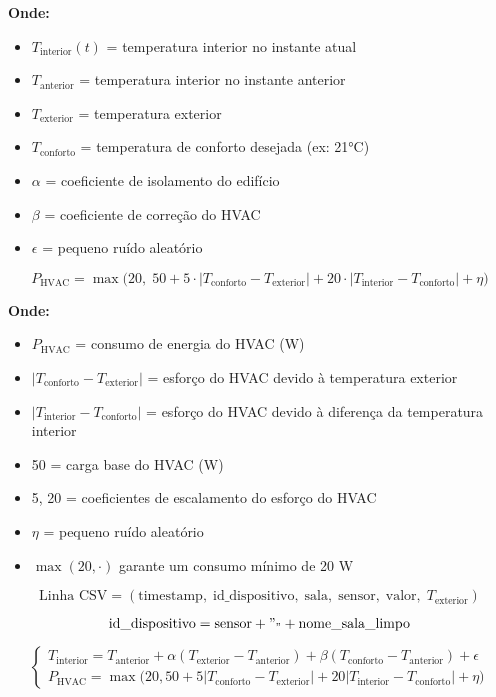 \documentclass[a4paper, 12pt]{article} %
\begin{document}
\textbf{Onde:}
\begin{itemize}
	\item $T_{\text{interior}}(t)$ = temperatura interior no instante atual
	\item $T_{\text{anterior}}$ = temperatura interior no instante anterior
	\item $T_{\text{exterior}}$ = temperatura exterior
	\item $T_{\text{conforto}}$ = temperatura de conforto desejada (ex: 21°C)
	\item $\alpha$ = coeficiente de isolamento do edifício
	\item $\beta$ = coeficiente de correção do HVAC
	\item $\epsilon$ = pequeno ruído aleatório
\end{itemize}

\[
P_{\text{HVAC}} = \max \Bigg(20, \; 50 + 5 \cdot |T_{\text{conforto}} - T_{\text{exterior}}| + 20 \cdot |T_{\text{interior}} - T_{\text{conforto}}| + \eta \Bigg)
\]

\textbf{Onde:}
\begin{itemize}
	\item $P_{\text{HVAC}}$ = consumo de energia do HVAC (W)
	\item $|T_{\text{conforto}} - T_{\text{exterior}}|$ = esforço do HVAC devido à temperatura exterior
	\item $|T_{\text{interior}} - T_{\text{conforto}}|$ = esforço do HVAC devido à diferença da temperatura interior
	\item 50 = carga base do HVAC (W)
	\item 5, 20 = coeficientes de escalamento do esforço do HVAC
	\item $\eta$ = pequeno ruído aleatório
	\item $\max(20, \cdot)$ garante um consumo mínimo de 20 W
\end{itemize}

\[
\text{Linha CSV} = (\text{timestamp}, \; \text{id\_dispositivo}, \; \text{sala}, \; \text{sensor}, \; \text{valor}, \; T_{\text{exterior}})
\]

\[
\text{id\_dispositivo} = \text{sensor} + "_" + \text{nome\_sala\_limpo}
\]

\[
\begin{cases}
	T_{\text{interior}} = T_{\text{anterior}} + \alpha (T_{\text{exterior}} - T_{\text{anterior}}) + \beta (T_{\text{conforto}} - T_{\text{anterior}}) + \epsilon \\
	P_{\text{HVAC}} = \max \big( 20, 50 + 5|T_{\text{conforto}} - T_{\text{exterior}}| + 20|T_{\text{interior}} - T_{\text{conforto}}| + \eta \big)
\end{cases}
\]

\nocite{*}

\end{document}
